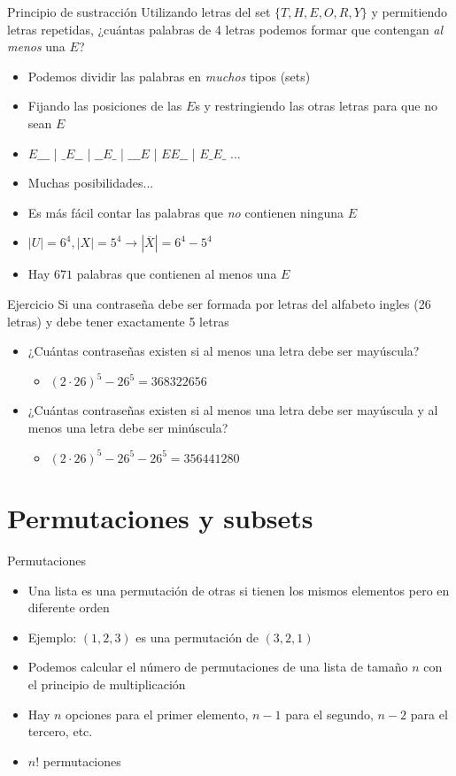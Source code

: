 \documentclass[10pt]{beamer}
\newcommand{\bi}{\begin{itemize}}
\newcommand{\ei}{\end{itemize}}
\begin{document}
\begin{frame}{Principio de sustracción}
  Utilizando letras del set $\{T, H, E, O, R, Y\}$ y permitiendo letras repetidas, 
  ¿cuántas palabras de 4 letras podemos formar que contengan \textit{al menos} una $E$?

  \bi
    \item<2-> Podemos dividir las palabras en \textit{muchos} tipos (sets)
    \item<2-> Fijando las posiciones de las $E$s y restringiendo las otras letras para que no sean $E$
    \item<2-> $E\_\_\_$ | $\_E\_\_$ | $\_\_E\_$ | $\_\_\_E$ | $EE\_\_$ | $E\_E\_$ ...
    \item<3-> Muchas posibilidades...
    \item<4-> Es más fácil contar las palabras que \textit{no} contienen ninguna $E$
    \item<4-> $|U| = 6^4, |X| = 5^4 \rightarrow |\overline{X}| = 6^4 - 5^4$
    \item<4-> Hay $671$ palabras que contienen al menos una $E$
  \ei
\end{frame}

\begin{frame}{Ejercicio}
  Si una contraseña debe ser formada por letras del alfabeto ingles (26 letras) 
  y debe tener exactamente 5 letras

  \bi
    \item ¿Cuántas contraseñas existen si al menos una letra debe ser mayúscula?
    \bi
      \item<2-> $(2 \cdot 26)^5 - 26^5 = 368322656$
    \ei
    \item ¿Cuántas contraseñas existen si al menos una letra debe ser mayúscula y al menos una letra debe ser minúscula?
    \bi
      \item<3-> $(2 \cdot 26)^5 - 26^5 - 26^5 = 356441280$
    \ei
  \ei
\end{frame}

\section{Permutaciones y subsets}

\begin{frame}{Permutaciones}
  \bi
    \item Una lista es una permutación de otras si tienen los mismos elementos pero en diferente orden
    \item Ejemplo: $(1, 2, 3)$ es una permutación de $(3, 2, 1)$
    \item<2-> Podemos calcular el número de permutaciones de una lista de tamaño $n$ con el principio de multiplicación
    \item<2-> Hay $n$ opciones para el primer elemento, $n - 1$ para el segundo, $n - 2$ para el tercero, etc.
    \item<3-> $n!$ permutaciones
  \ei
\end{frame}
\end{document}
